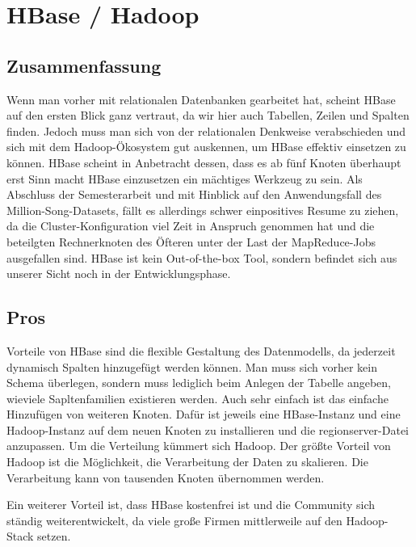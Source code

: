 \section{HBase / Hadoop}
\subsection{Zusammenfassung}
Wenn man vorher mit relationalen Datenbanken gearbeitet hat, scheint HBase auf den ersten Blick ganz vertraut, da wir hier auch Tabellen, Zeilen und Spalten finden. Jedoch muss man sich von der relationalen Denkweise verabschieden und sich mit dem Hadoop-Ökosystem gut auskennen, um HBase effektiv einsetzen zu können. HBase scheint in Anbetracht dessen, dass es ab fünf Knoten überhaupt erst Sinn macht HBase einzusetzen ein mächtiges Werkzeug zu sein. Als Abschluss der Semesterarbeit und mit Hinblick auf den Anwendungsfall des Million-Song-Datasets, fällt es allerdings schwer einpositives Resume zu ziehen, da die Cluster-Konfiguration viel Zeit in Anspruch genommen hat und die beteilgten Rechnerknoten des Öfteren unter der Last der MapReduce-Jobs ausgefallen sind. HBase ist kein Out-of-the-box Tool, sondern befindet sich aus unserer Sicht noch in der Entwicklungsphase.

\subsection{Pros}
Vorteile von HBase sind die flexible Gestaltung des Datenmodells, da jederzeit dynamisch Spalten hinzugefügt werden können. Man muss sich vorher kein Schema überlegen, sondern muss lediglich beim Anlegen der Tabelle angeben, wieviele Sapltenfamilien existieren werden. Auch sehr einfach ist das einfache Hinzufügen von weiteren Knoten. Dafür ist jeweils eine HBase-Instanz und eine Hadoop-Instanz auf dem neuen Knoten zu installieren und die regionserver-Datei anzupassen. Um die Verteilung kümmert sich Hadoop.
Der größte Vorteil von Hadoop ist die Möglichkeit, die Verarbeitung der Daten zu skalieren. Die Verarbeitung kann von tausenden Knoten übernommen werden. %

Ein weiterer Vorteil ist, dass HBase kostenfrei ist und die Community sich ständig weiterentwickelt, da viele große Firmen mittlerweile auf den Hadoop-Stack setzen. 

%



